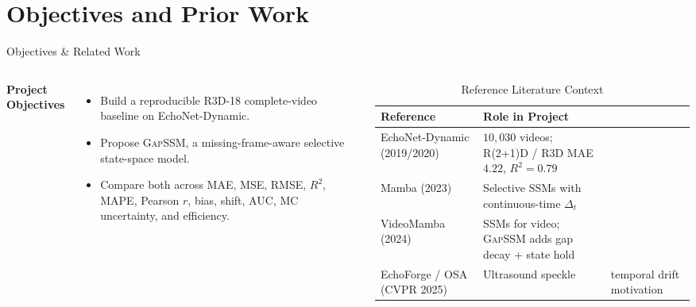 \documentclass[aspectratio=169,11pt]{beamer}
\begin{document}
\section{Objectives and Prior Work}
\begin{frame}{Objectives \& Related Work}
\begin{columns}
\textbf{Project Objectives}
\begin{itemize}
    \item Build a reproducible R3D-18 complete-video baseline on EchoNet-Dynamic.
    \item Propose \textsc{GapSSM}, a missing-frame-aware selective state-space model.
    \item Compare both across MAE, MSE, RMSE, $R^2$, MAPE, Pearson $r$, bias, shift, AUC, MC uncertainty, and efficiency.
\end{itemize}
\begin{table}\centering\scriptsize
\caption{Reference Literature Context}
\begin{tabular}{p{2.3cm}p{2.7cm}}\toprule
Reference & Role in Project \\\midrule
EchoNet-Dynamic (2019/2020) & $10,030$ videos; R(2+1)D / R3D MAE $4.22$, $R^2=0.79$ \\
Mamba (2023) & Selective SSMs with continuous-time $\Delta_t$ \\
VideoMamba (2024) & SSMs for video; \textsc{GapSSM} adds gap decay + state hold \\
EchoForge / OSA (CVPR 2025) & Ultrasound speckle & temporal drift motivation \\
\bottomrule
\end{tabular}
\end{table}
\end{columns}
\end{frame}
\end{document}
